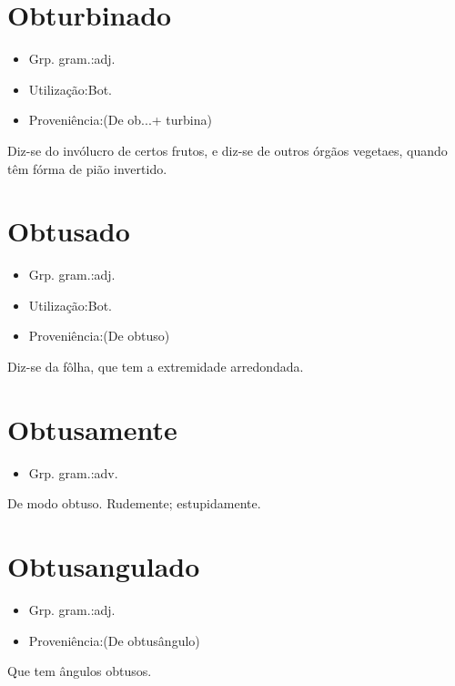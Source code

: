 \section{Obturbinado}
\begin{itemize}
\item {Grp. gram.:adj.}
\end{itemize}
\begin{itemize}
\item {Utilização:Bot.}
\end{itemize}
\begin{itemize}
\item {Proveniência:(De \textunderscore ob...\textunderscore  + \textunderscore turbina\textunderscore )}
\end{itemize}
Diz-se do invólucro de certos frutos, e diz-se de outros órgãos vegetaes, quando têm fórma de pião invertido.
\section{Obtusado}
\begin{itemize}
\item {Grp. gram.:adj.}
\end{itemize}
\begin{itemize}
\item {Utilização:Bot.}
\end{itemize}
\begin{itemize}
\item {Proveniência:(De \textunderscore obtuso\textunderscore )}
\end{itemize}
Diz-se da fôlha, que tem a extremidade arredondada.
\section{Obtusamente}
\begin{itemize}
\item {Grp. gram.:adv.}
\end{itemize}
De modo obtuso.
Rudemente; estupidamente.
\section{Obtusangulado}
\begin{itemize}
\item {Grp. gram.:adj.}
\end{itemize}
\begin{itemize}
\item {Proveniência:(De \textunderscore obtusângulo\textunderscore )}
\end{itemize}
Que tem ângulos obtusos.
